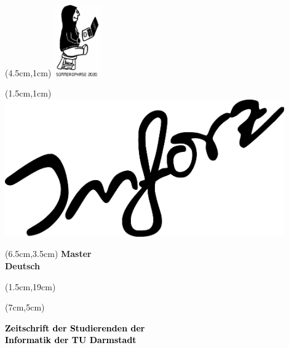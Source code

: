 \begin{titlepage}~


\begin{textblock*}{12cm}(4.5cm,1cm)
\includegraphics[width=2cm]{../grafik/wesen/wesen_ophase}
\end{textblock*}

\begin{textblock*}{12cm}(1.5cm,1cm)
	\includegraphics[width=12cm]{../grafik/inforz_schwarz}
\end{textblock*}


\begin{textblock*}{12cm}(6.5cm,3.5cm)
\centering\fontsize{25}{25}\sffamily\textbf{
\textcolor{mycolor}{Master } \\
\textcolor{mycolor}{Deutsch}}
\end{textblock*}



\begin{textblock*}{12cm}(1.5cm,19cm)
\end{textblock*}


\begin{textblock*}{7cm}(7cm,5cm)
\begin{flushright}
\large\sffamily\textbf{
	\textcolor{black}{Zeitschrift der Studierenden der}\\
	\textcolor{black}{Informatik der TU Darmstadt}}
\end{flushright}
\end{textblock*}


\end{titlepage}
